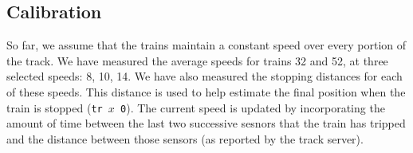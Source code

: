 \documentclass{article}
\begin{document}
\subsection{Calibration}
So far, we assume that the trains maintain a constant speed over every portion
of the track. We have measured the average speeds for trains 32 and 52, at three
selected speeds: 8, 10, 14. We have also measured the stopping distances for
each of these speeds. This distance is used to help estimate the final position
when the train is stopped (\texttt{tr $x$ 0}).
The current speed is updated by incorporating the amount of time between the
last two successive sesnors that the train has tripped and the distance between
those sensors (as reported by the track server).
\end{document}
